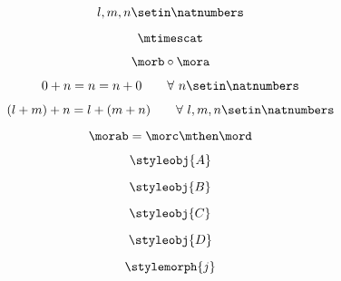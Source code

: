 \begin{forslides}
        \begin{equation}
            \label{eq:semicats-slides-41}
            l, m, n \setin \natnumbers
        \end{equation}

        \begin{equation}
            \label{eq:semicats-slides-42}
            \mtimescat
        \end{equation}

        \begin{equation}
            \label{eq:semicats-slides-43}
            \morb \circ \mora
        \end{equation}

        \begin{equation}
            \label{eq:semicats-slides-44}
            0 + n = n = n + 0   \quad \quad \forall \ n \setin \natnumbers
        \end{equation}

        \begin{equation}
            \label{eq:semicats-slides-45}
            (l + m) + n = l + (m + n) \quad \quad  \forall \ l, m, n \setin \natnumbers
        \end{equation}

        \begin{equation}
            \label{eq:semicats-slides-46}
            \morab = \morc \mthen \mord
        \end{equation}

        \begin{equation}
            \label{eq:semicats-slides-47}
            \styleobj{A}
        \end{equation}

        \begin{equation}
            \label{eq:semicats-slides-48}
            \styleobj{B}
        \end{equation}

        \begin{equation}
            \label{eq:4semicats-slides-9}
            \styleobj{C}
        \end{equation}

        \begin{equation}
            \label{eq:semicats-slides-50}
            \styleobj{D}
        \end{equation}

        \begin{equation}
            \label{eq:semicats-slides-51}
            \stylemorph{j}
        \end{equation}


\end{forslides}
